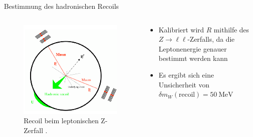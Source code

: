 \documentclass[aspectratio=1610, 9pt]{beamer}
\begin{document}
\begin{frame}{Bestimmung des hadronischen Recoils}
\end{frame}

\begin{frame}
  \begin{columns}
    \begin{column}{0.4\textwidth}
      \begin{figure}
        \includegraphics[width=\textwidth]{images/z-recoil.png}
        \caption{Recoil beim leptonischen Z-Zerfall \cite{recoil}.}
      \end{figure}
    \end{column}
    \begin{column}{0.4\textwidth}
      \begin{itemize}
        \item Kalibriert wird $R$ mithilfe des $Z \rightarrow \ell \ell$-Zerfalls, da die Leptonenergie genauer bestimmt werden kann
        \item Es ergibt sich eine Unsicherheit von $\delta m_W (\text{recoil}) = \SI{50}{\MeV}$
      \end{itemize}
    \end{column}
  \end{columns}
\end{frame}
\end{document}
